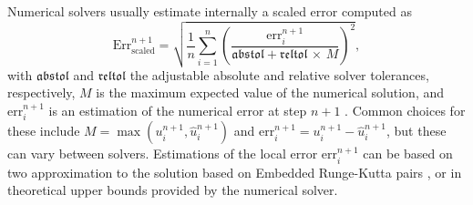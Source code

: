 
Numerical solvers usually estimate internally a scaled error computed as 
\begin{equation}
    \text{Err}_\text{scaled}^{n+1}
    =
    \sqrt{
    \frac{1}{n} \sum_{i=1}^n \left( \frac{\text{err}_i^{n+1}}{\mathfrak{abstol} + \mathfrak{reltol} \, \times \, M} \right)^2 },
    \label{eq:internal-norm-wrong}
\end{equation}
with $\mathfrak{abstol}$ and $\mathfrak{reltol}$ the adjustable absolute and relative solver tolerances, respectively, $M$ is the maximum expected value of the numerical solution, and $\text{err}_i^{n+1}$ is an estimation of the numerical error at step $n+1$ \cite{hairer-solving-1, Rackauckas_Nie_2016}. 
Common choices for these include $M = \max (u_i^{n+1}, \hat u_i^{n+1})$ and $\text{err}_i^{n+1} = u_i^{n+1} - \hat u_i^{n+1}$, but these can vary between solvers. 
Estimations of the local error $\text{err}_i^{n+1}$ can be based on two approximation to the solution based on Embedded Runge-Kutta pairs   \cite{Ranocha_Dalcin_Parsani_Ketcheson_2022, hairer-solving-1}, or in theoretical upper bounds provided by the numerical solver. 

